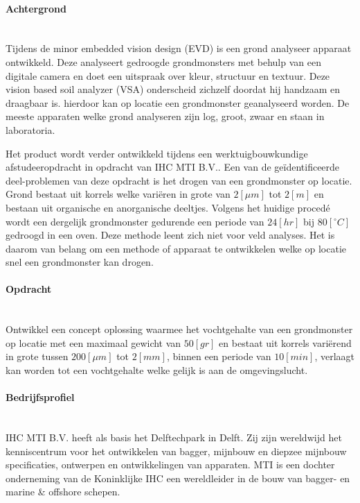 \documentclass[a4paper,11pt]{../LatexDocStructures/MTItexMemo} %
\begin{document}
\maketitle %

\paragraph{Achtergrond}\mbox{} \\
Tijdens de minor embedded vision design (EVD) is een grond analyseer apparaat ontwikkeld. Deze analyseert gedroogde grondmonsters met behulp van een digitale camera en doet een uitspraak over kleur, structuur en textuur. Deze vision based soil analyzer (VSA) onderscheid zichzelf doordat hij handzaam en draagbaar is. hierdoor kan op locatie een grondmonster geanalyseerd worden. De meeste apparaten welke grond analyseren zijn log, groot, zwaar en staan in laboratoria.

Het product wordt verder ontwikkeld tijdens een werktuigbouwkundige afstudeeropdracht in opdracht van IHC MTI B.V.. Een van de ge\"identificeerde deel-problemen van deze opdracht is het drogen van een grondmonster op locatie. Grond bestaat uit korrels welke vari\"eren in grote van $ 2 [\mu m] $ tot $ 2 [m] $ en bestaan uit organische en anorganische deeltjes. Volgens het huidige proced\'e wordt een dergelijk grondmonster gedurende een periode van $ 24 [hr] $ bij $ 80 [ ^{\circ} C] $ gedroogd in een oven. Deze methode leent zich niet voor veld analyses. Het is daarom van belang om een methode of apparaat te ontwikkelen welke op locatie snel een grondmonster kan drogen.

\paragraph{Opdracht}\mbox{} \\
Ontwikkel een concept oplossing waarmee het vochtgehalte van een grondmonster op locatie met een maximaal gewicht van $ 50 [gr] $ en bestaat uit korrels vari\"erend in grote tussen $ 200 [\mu m] $ tot $ 2 [mm] $, binnen een periode van $ 10 [min] $, verlaagt kan worden tot een vochtgehalte welke gelijk is aan de omgevingslucht.

\paragraph{Bedrijfsprofiel}\mbox{} \\
IHC MTI B.V. heeft als basis het Delftechpark in Delft. Zij zijn wereldwijd het kenniscentrum voor het ontwikkelen van bagger, mijnbouw en diepzee mijnbouw specificaties, ontwerpen en ontwikkelingen van apparaten. MTI is een dochter onderneming van de Koninklijke IHC een wereldleider in de bouw van bagger- en marine \& offshore schepen.
\end{document}
